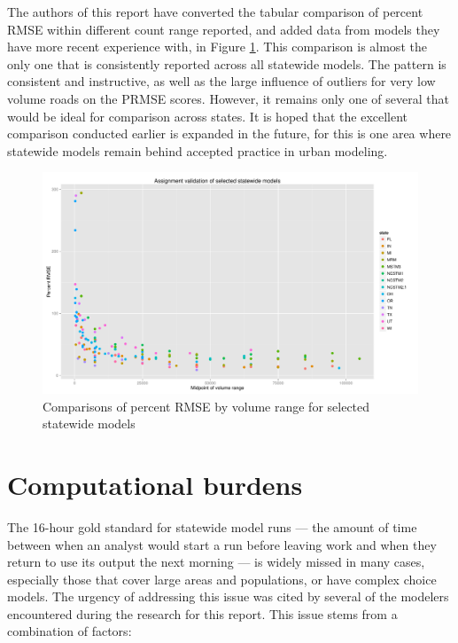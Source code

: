 The authors of this report have converted the tabular comparison of percent RMSE within different count range reported, and added data from models they have more recent experience with, in Figure \ref{fig:prmse-comparisons}. This comparison is almost the only one that is consistently reported across all statewide models. The pattern is consistent and instructive, as well as the large influence of outliers for very low volume roads on the PRMSE scores. However, it remains only one of several that would be ideal for comparison across states. It is hoped that the excellent comparison conducted earlier is expanded in the future, for this is one area where statewide models remain behind accepted practice in urban modeling.

\begin{figure}
\centering
\includegraphics[width=6.5in]{graphics/47-prmse-comparisons}
\caption{Comparisons of percent RMSE by volume range for selected statewide models}
\label{fig:prmse-comparisons}
\end{figure}

\section{Computational burdens}

The 16-hour gold standard for statewide model runs --- the amount of time between when an analyst would start a run before leaving work and when they return to use its output the next morning --- is widely missed in many cases, especially those that cover large areas and populations, or have complex choice models. The urgency of addressing this issue was cited by several of the modelers encountered during the research for this report. This issue stems from a combination of factors:

